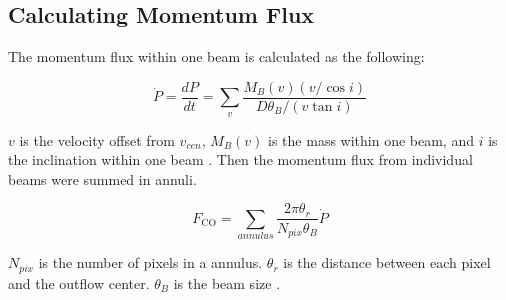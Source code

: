\subsection{Calculating Momentum Flux}

The momentum flux within one beam is calculated as the following:

\begin{equation}
\dot{P} = \frac{dP}{dt} = \sum_{v} {\frac{M_B (v) (v/ \cos i)}{D\theta_B / (v \tan i)}}
\end{equation}

$v$ is the velocity offset from $v_{cen}$, $M_B (v)$ is the mass within one beam, and $i$ is the inclination within one beam \cite{hatchell2007star}.
Then the momentum flux from individual beams were summed in annuli. 

\begin{equation}
F_{\textrm{CO}} = \sum _{annulus} \frac{2\pi \theta_r}{N_{pix}\theta_B}\dot{P}	
\end{equation}

$N_{pix}$ is the number of pixels in a annulus. $\theta_r$ is the distance between each pixel and the outflow center. $\theta_B$ is the beam size \cite{hatchell2007star, van2013outflow}.
